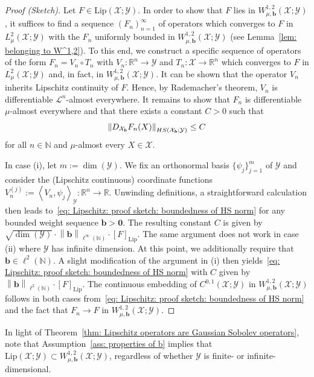 \documentclass[namedate,webpdf]{ima-authoring-template-blank}
\newcommand*{\Lip}{\mathrm{Lip}}  %
\newcommand*{\HS}{\textup{HS}}
\newcommand*{\nm}[1]{{\left\|#1\right \|}}
\newcommand*{\ip}[2]{\left\langle #1, #2 \right\rangle}
\numberwithin{counter}{section}
\numberwithin{equation}{section}
\theoremstyle{plain}
\theoremstyle{definition}
\newcommand*{\cL}{\mathcal{L}}
\newcommand*{\cX}{\mathcal{X}}
\newcommand*{\cY}{\mathcal{Y}}
\newcommand*{\bbN}{\mathbb{N}}
\newcommand*{\bbR}{\mathbb{R}}
\theoremstyle{thmstyletwo}
\begin{document}
\begin{proof}[Proof (Sketch)]
    Let \(F \in \Lip(\cX; \cY)\). In order to show that \(F\) lies in \(W_{\mu, \bm{b}}^{1,2}(\cX; \cY)\), it suffices to find a sequence \((F_n)_{n = 1}^{\infty}\) of operators which converges to \(F\) in \(L_{\mu}^2(\cX; \cY)\) with the \(F_n\) uniformly bounded in \(W_{\mu, \bm{b}}^{1,2}(\cX; \cY)\) (see Lemma~\ref{lem: belonging to W^1,2}). To this end, we construct a specific sequence of operators of the form \(F_n = V_n \circ T_n\) with \(V_n: \bbR^n \to \cY\) and \(T_n: \cX \to \bbR^n\) which converges to \(F\) in \(L_{\mu}^2(\cX; \cY)\) and, in fact, in \(W_{\mu, \bm{b}}^{1, 2}(\cX; \cY)\). It can be shown that the operator \(V_n\) inherits Lipschitz continuity of \(F\). Hence, by Rademacher's theorem, \(V_n\) is differentiable \(\cL^n\)-almost everywhere. It remains to show that \(F_n\) is differentiable \(\mu\)-almost everywhere and that there exists a constant \(C > 0\) such that
    \begin{equation}
    \label{eq: Lipschitz: proof sketch: boundedness of HS norm}
        \nm{D_{\cX_{\bm{b}}} F_n(X)}_{\HS(\cX_{\bm{b}};\cY)} \leq C
    \end{equation}
    for all \(n \in \bbN\) and \(\mu\)-almost every \(X \in \cX\). 

    In case (i), let \(m := \dim({\cY})\). We fix an orthonormal basis \(\{\psi_j\}_{j = 1}^m\) of \(\cY\) and consider the (Lipschitz continuous) coordinate functions \(V_n^{(j)} := \ip{V_n}{\psi_j}_{\cY}: \bbR^n \to \bbR\). Unwinding definitions, a straightforward calculation then leads to~\eqref{eq: Lipschitz: proof sketch: boundedness of HS norm} for any bounded weight sequence \(\bm{b} > \bm{0}\). The resulting constant \(C\) is given by \(\sqrt{\dim(\cY)} \cdot \nm{\bm{b}}_{\ell^{\infty}(\bbN)} \cdot [F]_{\Lip}\).     
    The same argument does not work in case (ii) where \(\cY\) has infinite dimension. At this point, we additionally require that \(\bm{b} \in \ell^2(\bbN)\). A slight modification of the argument in (i) then yields~\eqref{eq: Lipschitz: proof sketch: boundedness of HS norm} with \(C\) given by \(\nm{\bm{b}}_{\ell^2(\bbN)} \cdot [F]_{\Lip}\).
    The continuous embedding of \(C^{0, 1}(\cX; \cY)\) in \(W_{\mu, \bm{b}}^{1, 2}(\cX; \cY)\) follows in both cases from~\eqref{eq: Lipschitz: proof sketch: boundedness of HS norm} and the fact that \(F_n \to F\) in \(W_{\mu, \bm{b}}^{1, 2}(\cX; \cY)\).
\end{proof}

In light of Theorem~\ref{thm: Lipschitz operators are Gaussian Sobolev operators}, note that Assumption~\ref{ass: properties of b} implies that \(\Lip(\cX; \cY) \subset W_{\mu, \bm{b}}^{1, 2}(\cX; \cY)\), regardless of whether \(\cY\) is finite- or infinite-dimensional. 
\end{document}
